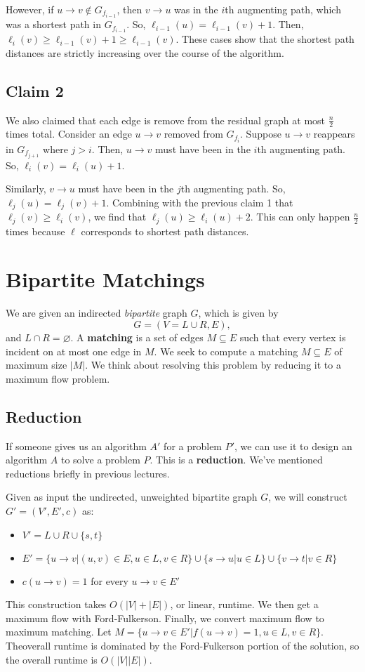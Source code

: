\documentclass[titlepage, 12pt, leqno]{article}
\begin{document}
However, if $u\rightarrow v \notin G_{f_{i-1}}$, then $v\rightarrow u$ was in 
the $i$th augmenting path, which was a shortest path in $G_{f_{i-1}}$. So,
$\ell_{i-1}(u)= \ell_{i-1}(v) + 1$. Then, $\ell_{i}(v) \ge \ell_{i-1}(v) + 1
\ge \ell_{i-1}(v)$. These cases show that the shortest path distances are
strictly increasing over the course of the algorithm.

\subsection{Claim 2}
We also claimed that each edge is remove from the residual graph at most
$\frac{n}{2}$ times total. Consider an edge $u \rightarrow v$ removed from
$G_{f_{i}}$. Suppose $u \rightarrow v$ reappears in $G_{f_{j+1}}$ where $j>i$.
Then, $u\rightarrow v$ must have been in the $i$th augmenting path. So,
$\ell_{i}(v) = \ell_{i}(u) + 1$. 

Similarly, $v\rightarrow u$ must have been in the $j$th augmenting path. So,
$\ell_{j}(u) = \ell_{j}(v) + 1$. Combining with the previous claim 1 that 
$\ell_{j}(v) \ge \ell_{i}(v)$, we find that $\ell_{j}(u) \ge \ell_{i}(u)+2$.
This can only happen $\frac{n}{2}$ times because $\ell$ corresponds to shortest
path distances.

\pagebreak
\section{Bipartite Matchings}
We are given an indirected \textit{bipartite} graph $G$, which is given by
\[
G = (V = L \cup R, E),
\]
and $L \cap R = \varnothing$. A \textbf{matching} is a set of edges 
$M \subseteq E$ such that every vertex is incident on at most one edge in $M$.
We seek to compute a matching $M \subseteq E$ of maximum size $|M|$. We think
about resolving this problem by reducing it to a maximum flow problem.

\subsection{Reduction}
If someone gives us an algorithm $A'$ for a problem $P'$, we can use it to 
design an algorithm $A$ to solve a problem $P$. This is a \textbf{reduction}.
We've mentioned reductions briefly in previous lectures.

Given as input the undirected, unweighted bipartite graph $G$, we will construct
$G' = (V', E', c)$ as:
\begin{itemize}
    \item $V' = L \cup R \cup \{s,t\}$
    \item $E' = \{u \rightarrow v | (u,v) \in E, u \in  L, v \in R\}
        \cup \{s\rightarrow u |u \in L\}
        \cup \{v \rightarrow t | v \in R\}$
    \item $c(u \rightarrow v) = 1$ for every $u \rightarrow v \in E'$
\end{itemize}
This construction takes $O(|V| + |E|)$, or linear, runtime. We then get a 
maximum flow with Ford-Fulkerson. Finally, we convert maximum flow to maximum
matching. Let $M = \{u \rightarrow v \in E' | f(u\rightarrow v) = 1, u \in L,
v \in R\}$. Theoverall runtime is dominated by the Ford-Fulkerson portion of 
the solution, so the overall runtime is $O(|V||E|)$.
\end{document}
